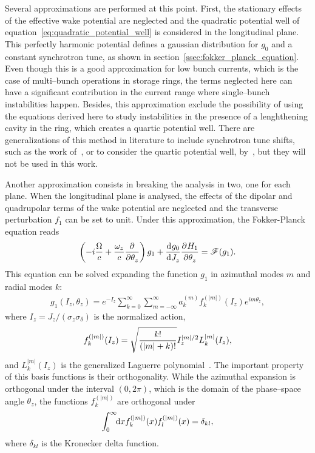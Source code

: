     Several approximations are performed at this point. First, the stationary effects of the effective wake potential are neglected and the quadratic potential well of equation~\eqref{eq:quadratic_potential_well} is considered in the longitudinal plane. This perfectly harmonic potential defines a gaussian distribution for $g_0$ and a constant synchrotron tune, as shown in section~\ref{ssec:fokker_planck_equation}. Even though this is a good approximation for low bunch currents, which is the case of multi--bunch operations in storage rings, the terms neglected here can have a significant contribution in the current range where single--bunch instabilities happen. Besides, this approximation exclude the possibility of using the equations derived here to study instabilities in the presence of a lenghthening cavity in the ring, which creates a quartic potential well. There are generalizations of this method in literature to include synchrotron tune shifts, such as the work of~, or to consider the quartic potential well, by~, but they will not be used in this work.

    Another approximation consists in breaking the analysis in two, one for each plane. When the longitudinal plane is analysed, the effects of the dipolar and quadrupolar terms of the wake potential are neglected and the transverse perturbation $f_1$ can be set to unit. Under this approximation, the Fokker-Planck equation reads
    \begin{align}
        \fof{-i\frac{\Omega}{c} +\frac{\omega_z}{c}\derpar{}{\theta_z}}g_1 + \dertot{g_0}{J_z}\derpar{H_1}{\theta_z} = \mathscr{F}(g_1).
    \end{align}
    This equation can be solved expanding the function $g_1$ in azimuthal modes $m$ and radial modes $k$:
    \begin{align}
        g_1(I_z, \theta_z) = e^{-I_z}\sum_{k=0}^\infty\sum_{m=-\infty}^\infty
        a_k^{(m)} f_k^{(|m|)}(I_z)e^{im\theta_z},
    \end{align}
    where $I_z = J_z/(\sigma_z\sigma_\delta)$ is the normalized action,
    \begin{align}
        f_k^{(|m|)}(I_z) = \sqrt{\frac{k!}{\fof{|m|+k}!}}I_z^{|m|/2}L_k^{|m|}(I_z),
    \end{align}
    and $L_k^{|m|}(I_z)$ is the generalized Laguerre polynomial~\cite{wiki2018}. The important property of this basis functions is their orthogonality. While the azimuthal expansion is orthogonal under the interval $(0, 2\pi)$, which is the domain of the phase--space angle $\theta_z$, the functions $f_k^{(|m|)}$ are orthogonal under
    \begin{align}
        \defint{x}{f_k^{(|m|)}(x)f_l^{(|m|)}(x)}{0}{\infty} = \delta_{kl},
    \end{align}
    where $\delta_{kl}$ is the Kronecker delta function.



